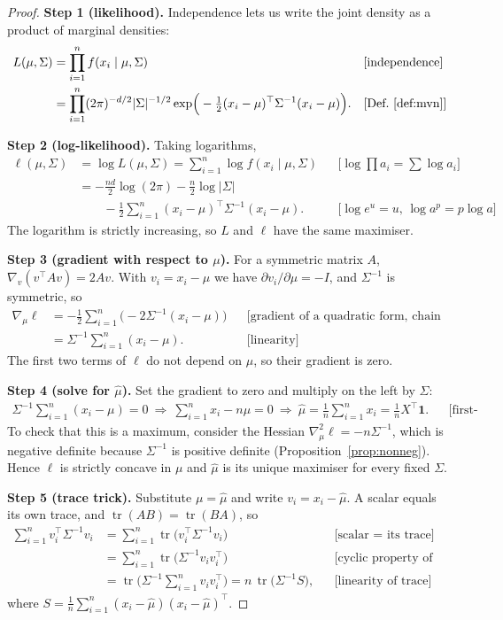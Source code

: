 \documentclass[11pt]{article}
\theoremstyle{definition}
\newcommand{\T}{^{\top}}
\newcommand{\tr}{\operatorname{tr}}
\newcommand{\rul}[1]{\text{[#1]}}
\begin{document}
\begin{proof}
\textbf{Step 1 (likelihood).} Independence lets us write the joint density as a product of marginal densities:
\begin{align*}
L(\mu,\Sigma) &= \prod_{i=1}^n f(x_i\mid\mu,\Sigma) && \rul{independence}\\
&= \prod_{i=1}^n (2\pi)^{-d/2}|\Sigma|^{-1/2}\exp\!\Big(-\tfrac12(x_i-\mu)\T\Sigma^{-1}(x_i-\mu)\Big). && \rul{Def.~\ref{def:mvn}}
\end{align*}

\textbf{Step 2 (log-likelihood).} Taking logarithms,
\begin{align*}
\ell(\mu,\Sigma) &= \log L(\mu,\Sigma)=\sum_{i=1}^n\log f(x_i\mid\mu,\Sigma) && \rul{$\log\prod a_i=\sum\log a_i$}\\
&= -\frac{nd}{2}\log(2\pi)-\frac n2\log|\Sigma|\\
&\qquad -\frac12\sum_{i=1}^n(x_i-\mu)\T\Sigma^{-1}(x_i-\mu). && \rul{$\log e^u=u$, $\log a^p=p\log a$}
\end{align*}
The logarithm is strictly increasing, so $L$ and $\ell$ have the same maximiser.

\textbf{Step 3 (gradient with respect to $\mu$).} For a symmetric matrix $A$, $\nabla_v(v\T Av)=2Av$. With $v_i=x_i-\mu$ we have $\partial v_i/\partial\mu=-I$, and $\Sigma^{-1}$ is symmetric, so
\begin{align*}
\nabla_\mu\ell &= -\frac12\sum_{i=1}^n\big(-2\Sigma^{-1}(x_i-\mu)\big) && \rul{gradient of a quadratic form, chain rule}\\
&= \Sigma^{-1}\sum_{i=1}^n(x_i-\mu). && \rul{linearity}
\end{align*}
The first two terms of $\ell$ do not depend on $\mu$, so their gradient is zero.

\textbf{Step 4 (solve for $\hat\mu$).} Set the gradient to zero and multiply on the left by $\Sigma$:
\begin{align*}
\Sigma^{-1}\sum_{i=1}^n(x_i-\mu)=0 \ \Longrightarrow\ \sum_{i=1}^n x_i-n\mu=0 \ \Longrightarrow\ \hat\mu=\frac1n\sum_{i=1}^n x_i=\frac1n X\T\mathbf 1. && \rul{first-order condition}
\end{align*}
To check that this is a maximum, consider the Hessian $\nabla^2_\mu\ell=-n\Sigma^{-1}$, which is negative definite because $\Sigma^{-1}$ is positive definite (Proposition~\ref{prop:nonneg}). Hence $\ell$ is strictly concave in $\mu$ and $\hat\mu$ is its unique maximiser for every fixed $\Sigma$.

\textbf{Step 5 (trace trick).} Substitute $\mu=\hat\mu$ and write $v_i=x_i-\hat\mu$. A scalar equals its own trace, and $\tr(AB)=\tr(BA)$, so
\begin{align*}
\sum_{i=1}^n v_i\T\Sigma^{-1}v_i &= \sum_{i=1}^n\tr\big(v_i\T\Sigma^{-1}v_i\big) && \rul{scalar $=$ its trace}\\
&= \sum_{i=1}^n\tr\big(\Sigma^{-1}v_iv_i\T\big) && \rul{cyclic property of trace}\\
&= \tr\Big(\Sigma^{-1}\sum_{i=1}^n v_iv_i\T\Big)=n\,\tr\big(\Sigma^{-1}S\big), && \rul{linearity of trace}
\end{align*}
where $S=\frac1n\sum_{i=1}^n(x_i-\hat\mu)(x_i-\hat\mu)\T$.


\end{proof}
\end{document}
